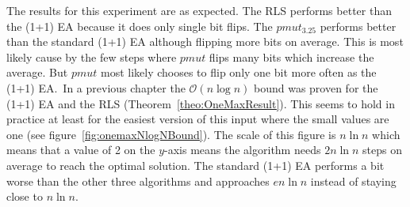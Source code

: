 

The results for this experiment are as expected.
The RLS performs better than the (1+1) EA because it does only single bit flips.
The $pmut_{3.25}$ performs better than the standard (1+1) EA although flipping more bits on average.
This is most likely cause by the few steps where $pmut$ flips many bits which increase the average.
But $pmut$ most likely chooses to flip only one bit more often as the (1+1) EA.\
In a previous chapter the $\mathcal{O}(n\log n)$ bound was proven for the (1+1) EA and the RLS (Theorem~\ref{theo:OneMaxResult}).
This seems to hold in practice at least for the easiest version of this input where the small values are one (see figure~\ref{fig:onemaxNlogNBound}).
The scale of this figure is $n\ln n$ which means that a value of 2 on the $y$-axis means the algorithm needs $2n\ln n$ steps on average to reach the optimal solution.
The standard (1+1) EA performs a bit worse than the other three algorithms and approaches $en\ln n$ instead of staying close to $n\ln n$.

